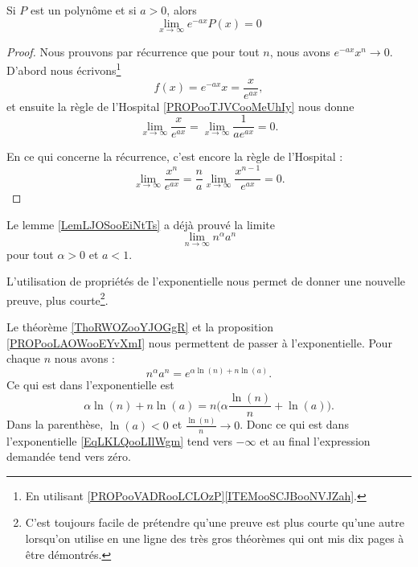 \begin{lemma}       \label{LEMooNYFVooXjFShk}
    Si \( P\) est un polynôme et si \( a>0\), alors
    \begin{equation}
        \lim_{x\to \infty}  e^{-ax}P(x)=0
    \end{equation}
\end{lemma}

\begin{proof}
    Nous prouvons par récurrence que pour tout \( n\), nous avons \(  e^{-ax}x^n\to 0\). D'abord nous écrivons\footnote{En utilisant \ref{PROPooVADRooLCLOzP}\ref{ITEMooSCJBooNVJZah}.}
    \begin{equation}
        f(x)= e^{-ax}x=\frac{ x }{  e^{ax} },
    \end{equation}
    et ensuite la règle de l'Hospital \ref{PROPooTJVCooMeUhIy} nous donne
    \begin{equation}
        \lim_{x\to \infty} \frac{ x }{  e^{ax} }=\lim_{x\to \infty} \frac{1}{ a e^{ax} }=0.
    \end{equation}

    En ce qui concerne la récurrence, c'est encore la règle de l'Hospital :
    \begin{equation}
        \lim_{x\to \infty} \frac{ x^n }{  e^{ax} }=\frac{ n }{ a }\lim_{x\to \infty} \frac{ x^{n-1} }{  e^{ax} }=0.
    \end{equation}
\end{proof}

\begin{example}     \label{EXooQNCJooFpnvnf}
   Le lemme \ref{LemLJOSooEiNtTs} a déjà prouvé la limite 
    \begin{equation}
        \lim_{n\to \infty} n^{\alpha}a^n
    \end{equation}
    pour tout \( \alpha>0\) et \( a<1\).

    L'utilisation de propriétés de l'exponentielle nous permet de donner une nouvelle preuve, plus courte\footnote{C'est toujours facile de prétendre qu'une preuve est plus courte qu'une autre lorsqu'on utilise en une ligne des très gros théorèmes qui ont mis dix pages à être démontrés.}.

    Le théorème \ref{ThoRWOZooYJOGgR} et la proposition \ref{PROPooLAOWooEYvXmI} nous permettent de passer à l'exponentielle. Pour chaque \( n\) nous avons :
    \begin{equation}        \label{EqLKLQooLIlWgm}
        n^{\alpha}a^n= e^{\alpha\ln(n)+n\ln(a)}.
    \end{equation}
    Ce qui est dans l'exponentielle est
    \begin{equation}
        \alpha\ln(n)+n\ln(a)=n\big(\alpha \frac{ \ln(n) }{ n }+\ln(a) \big).
    \end{equation}
    Dans la parenthèse, \( \ln(a)<0\) et \( \frac{ \ln(n) }{ n }\to 0\). Donc ce qui est dans l'exponentielle \eqref{EqLKLQooLIlWgm} tend vers \( -\infty\) et au final l'expression demandée tend vers zéro.
\end{example}

